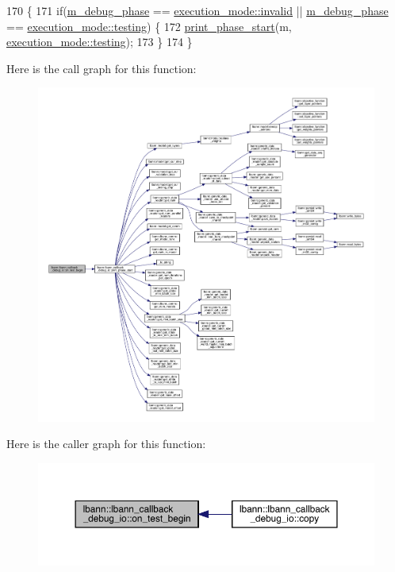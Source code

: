 \begin{DoxyCode}
170                                                          \{
171   \textcolor{keywordflow}{if}(\hyperlink{classlbann_1_1lbann__callback__debug__io_add73fbc786ca9284fa3399a7e99d0b1f}{m\_debug\_phase} == \hyperlink{base_8hpp_a2781a159088df64ed7d47cc91c4dc0a8afedb2d84cafe20862cb4399751a8a7e3}{execution\_mode::invalid} || 
      \hyperlink{classlbann_1_1lbann__callback__debug__io_add73fbc786ca9284fa3399a7e99d0b1f}{m\_debug\_phase} == \hyperlink{base_8hpp_a2781a159088df64ed7d47cc91c4dc0a8aae2b1fca515949e5d54fb22b8ed95575}{execution\_mode::testing}) \{
172     \hyperlink{classlbann_1_1lbann__callback__debug__io_a528f4aea5f657f40b27c58a164d4095a}{print\_phase\_start}(m, \hyperlink{base_8hpp_a2781a159088df64ed7d47cc91c4dc0a8aae2b1fca515949e5d54fb22b8ed95575}{execution\_mode::testing});
173   \}
174 \}
\end{DoxyCode}
Here is the call graph for this function\+:\nopagebreak
\begin{figure}[H]
\begin{center}
\leavevmode
\includegraphics[width=350pt]{classlbann_1_1lbann__callback__debug__io_a469dfa4eece0a707a2d56f4c67aea9b7_cgraph}
\end{center}
\end{figure}
Here is the caller graph for this function\+:\nopagebreak
\begin{figure}[H]
\begin{center}
\leavevmode
\includegraphics[width=350pt]{classlbann_1_1lbann__callback__debug__io_a469dfa4eece0a707a2d56f4c67aea9b7_icgraph}
\end{center}
\end{figure}
